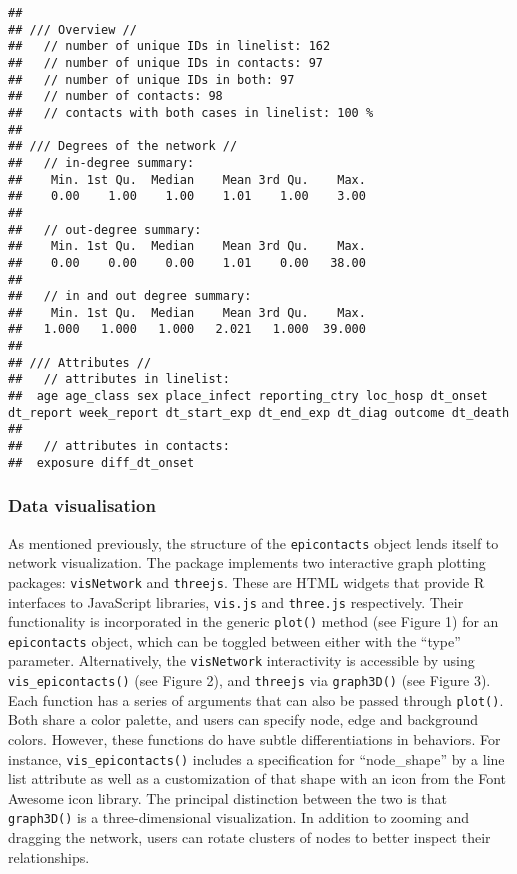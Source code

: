 \documentclass[9pt,a4paper,]{extarticle}
\theoremstyle{definition}
\theoremstyle{definition}
\theoremstyle{definition}
\theoremstyle{remark}
\begin{document}
\begin{verbatim}
## 
## /// Overview //
##   // number of unique IDs in linelist: 162
##   // number of unique IDs in contacts: 97
##   // number of unique IDs in both: 97
##   // number of contacts: 98
##   // contacts with both cases in linelist: 100 %
## 
## /// Degrees of the network //
##   // in-degree summary:
##    Min. 1st Qu.  Median    Mean 3rd Qu.    Max. 
##    0.00    1.00    1.00    1.01    1.00    3.00 
## 
##   // out-degree summary:
##    Min. 1st Qu.  Median    Mean 3rd Qu.    Max. 
##    0.00    0.00    0.00    1.01    0.00   38.00 
## 
##   // in and out degree summary:
##    Min. 1st Qu.  Median    Mean 3rd Qu.    Max. 
##   1.000   1.000   1.000   2.021   1.000  39.000 
## 
## /// Attributes //
##   // attributes in linelist:
##  age age_class sex place_infect reporting_ctry loc_hosp dt_onset dt_report week_report dt_start_exp dt_end_exp dt_diag outcome dt_death
## 
##   // attributes in contacts:
##  exposure diff_dt_onset
\end{verbatim}

\subsubsection{Data visualisation}\label{data-visualisation}

As mentioned previously, the structure of the \texttt{epicontacts} object lends itself to network visualization. The package implements two interactive graph plotting packages: \texttt{visNetwork} and \texttt{threejs}\citep{visNetwork}\citep{threejs}. These are HTML widgets that provide R interfaces to JavaScript libraries, \texttt{vis.js} and \texttt{three.js} respectively. Their functionality is incorporated in the generic \texttt{plot()} method (see Figure 1) for an \texttt{epicontacts} object, which can be toggled between either with the ``type'' parameter. Alternatively, the \texttt{visNetwork} interactivity is accessible by using \texttt{vis\_epicontacts()} (see Figure 2), and \texttt{threejs} via \texttt{graph3D()} (see Figure 3). Each function has a series of arguments that can also be passed through \texttt{plot()}. Both share a color palette, and users can specify node, edge and background colors. However, these functions do have subtle differentiations in behaviors. For instance, \texttt{vis\_epicontacts()} includes a specification for ``node\_shape'' by a line list attribute as well as a customization of that shape with an icon from the Font Awesome icon library. The principal distinction between the two is that \texttt{graph3D()} is a three-dimensional visualization. In addition to zooming and dragging the network, users can rotate clusters of nodes to better inspect their relationships.
\end{document}
